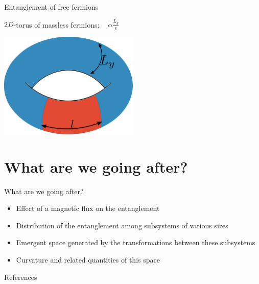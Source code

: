 \documentclass[11pt,aspectratio=169]{beamer}
\begin{document}
\begin{frame}{Entanglement of free fermions}
	\begin{minipage}{0.6\textwidth}
	\vspace{15pt}
	\(2D\)-torus of massless fermions: \(~ ~ ~ ~ \alpha \frac{L_y}{\epsilon} \)\\
	\end{minipage}
	\begin{minipage}{0.39\textwidth}
		\centering
		\includegraphics[width=0.5\textwidth]{figures/torus-EE.pdf}
	\end{minipage}
\end{frame}

\section{What are we going after?}

\begin{frame}{What are we going after?}
	\begin{itemize}
		\item Effect of a magnetic flux on the entanglement\\[20pt]
		\item Distribution of the entanglement among subsystems of various sizes\\[20pt]
		\item Emergent space generated by the transformations between these subsystems\\[20pt]
		\item Curvature and related quantities of this space
	\end{itemize}

\end{frame}


\begin{frame}[allowframebreaks]{References}
\printbibliography
\end{frame}
\end{document}
